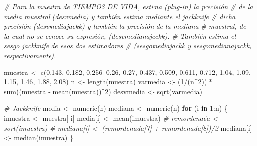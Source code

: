 \documentclass[
]{book}
\newenvironment{Shaded}{\begin{snugshade}}{\end{snugshade}}
\newcommand{\CommentTok}[1]{\textcolor[rgb]{0.56,0.35,0.01}{\textit{#1}}}
\newcommand{\ControlFlowTok}[1]{\textcolor[rgb]{0.13,0.29,0.53}{\textbf{#1}}}
\newcommand{\DecValTok}[1]{\textcolor[rgb]{0.00,0.00,0.81}{#1}}
\newcommand{\FloatTok}[1]{\textcolor[rgb]{0.00,0.00,0.81}{#1}}
\newcommand{\FunctionTok}[1]{\textcolor[rgb]{0.00,0.00,0.00}{#1}}
\newcommand{\NormalTok}[1]{#1}
\newcommand{\OtherTok}[1]{\textcolor[rgb]{0.56,0.35,0.01}{#1}}
\newcommand{\SpecialCharTok}[1]{\textcolor[rgb]{0.00,0.00,0.00}{#1}}
\theoremstyle{break}
\theoremstyle{definition}
\theoremstyle{definition}
\theoremstyle{definition}
\theoremstyle{definition}
\theoremstyle{remark}
\begin{document}
\begin{Shaded}
\begin{Highlighting}[]
\CommentTok{\# Para la muestra de TIEMPOS DE VIDA, estima (plug{-}in) la precisión }
\CommentTok{\# de la media muestral (desvmedia) y también estima mediante el jackknife }
\CommentTok{\# dicha precisión (desvmediajackk) y también la precisión de la mediana }
\CommentTok{\# muestral, de la cual no se conoce su expresión, (desvmedianajackk). }
\CommentTok{\# También estima el sesgo jackknife de esos dos estimadores}
\CommentTok{\# (sesgomediajackk y sesgomedianajackk, respectivamente).}

\NormalTok{muestra }\OtherTok{\textless{}{-}} \FunctionTok{c}\NormalTok{(}\FloatTok{0.143}\NormalTok{, }\FloatTok{0.182}\NormalTok{, }\FloatTok{0.256}\NormalTok{, }\FloatTok{0.26}\NormalTok{, }\FloatTok{0.27}\NormalTok{, }\FloatTok{0.437}\NormalTok{, }\FloatTok{0.509}\NormalTok{, }
    \FloatTok{0.611}\NormalTok{, }\FloatTok{0.712}\NormalTok{, }\FloatTok{1.04}\NormalTok{, }\FloatTok{1.09}\NormalTok{, }\FloatTok{1.15}\NormalTok{, }\FloatTok{1.46}\NormalTok{, }\FloatTok{1.88}\NormalTok{, }\FloatTok{2.08}\NormalTok{)}
\NormalTok{n }\OtherTok{\textless{}{-}} \FunctionTok{length}\NormalTok{(muestra)}
\NormalTok{varmedia }\OtherTok{\textless{}{-}}\NormalTok{ (}\DecValTok{1}\SpecialCharTok{/}\NormalTok{(n}\SpecialCharTok{\^{}}\DecValTok{2}\NormalTok{)) }\SpecialCharTok{*} \FunctionTok{sum}\NormalTok{((muestra }\SpecialCharTok{{-}} \FunctionTok{mean}\NormalTok{(muestra))}\SpecialCharTok{\^{}}\DecValTok{2}\NormalTok{)}
\NormalTok{desvmedia }\OtherTok{\textless{}{-}} \FunctionTok{sqrt}\NormalTok{(varmedia)}

\CommentTok{\# Jackknife}
\NormalTok{media }\OtherTok{\textless{}{-}} \FunctionTok{numeric}\NormalTok{(n)}
\NormalTok{mediana }\OtherTok{\textless{}{-}} \FunctionTok{numeric}\NormalTok{(n)}
\ControlFlowTok{for}\NormalTok{ (i }\ControlFlowTok{in} \DecValTok{1}\SpecialCharTok{:}\NormalTok{n) \{}
\NormalTok{    imuestra }\OtherTok{\textless{}{-}}\NormalTok{ muestra[}\SpecialCharTok{{-}}\NormalTok{i]}
\NormalTok{    media[i] }\OtherTok{\textless{}{-}} \FunctionTok{mean}\NormalTok{(imuestra)}
    \CommentTok{\# remordenada \textless{}{-} sort(imuestra)}
    \CommentTok{\# mediana[i] \textless{}{-} (remordenada[7] + remordenada[8])/2}
\NormalTok{    mediana[i] }\OtherTok{\textless{}{-}} \FunctionTok{median}\NormalTok{(imuestra)}
\NormalTok{\}}


\end{Highlighting}
\end{Shaded}
\end{document}
